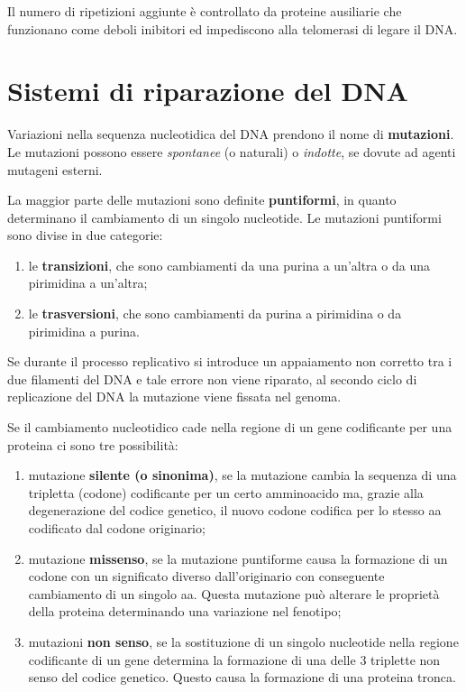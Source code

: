 \documentclass[11pt]{book}
\begin{document}
Il numero di ripetizioni aggiunte è controllato da proteine ausiliarie
che funzionano come deboli inibitori ed impediscono alla telomerasi di
legare il DNA.

\chapter{Sistemi di riparazione del
DNA}\label{sistemi-di-riparazione-del-dna}

Variazioni nella sequenza nucleotidica del DNA prendono il nome di
\textbf{mutazioni}. Le mutazioni possono essere \emph{spontanee} (o
naturali) o \emph{indotte}, se dovute ad agenti mutageni esterni.

La maggior parte delle mutazioni sono definite \textbf{puntiformi}, in
quanto determinano il cambiamento di un singolo nucleotide. Le mutazioni
puntiformi sono divise in due categorie:

\begin{enumerate}
\def\labelenumi{\arabic{enumi}.}
\itemsep1pt\parskip0pt
\item
  le \textbf{transizioni}, che sono cambiamenti da una purina a un'altra
  o da una pirimidina a un'altra;
\item
  le \textbf{trasversioni}, che sono cambiamenti da purina a pirimidina
  o da pirimidina a purina.
\end{enumerate}

Se durante il processo replicativo si introduce un appaiamento non
corretto tra i due filamenti del DNA e tale errore non viene riparato,
al secondo ciclo di replicazione del DNA la mutazione viene fissata nel
genoma.

Se il cambiamento nucleotidico cade nella regione di un gene codificante
per una proteina ci sono tre possibilità:

\begin{enumerate}
\def\labelenumi{\arabic{enumi}.}
\itemsep1pt\parskip0pt
\item
  mutazione \textbf{silente (o sinonima)}, se la mutazione cambia la
  sequenza di una tripletta (codone) codificante per un certo
  amminoacido ma, grazie alla degenerazione del codice genetico, il
  nuovo codone codifica per lo stesso aa codificato dal codone
  originario;
\item
  mutazione \textbf{missenso}, se la mutazione puntiforme causa la
  formazione di un codone con un significato diverso dall'originario con
  conseguente cambiamento di un singolo aa. Questa mutazione può
  alterare le proprietà della proteina determinando una variazione nel
  fenotipo;
\item
  mutazioni \textbf{non senso}, se la sostituzione di un singolo
  nucleotide nella regione codificante di un gene determina la formazione
  di una delle 3 triplette non senso del codice genetico. Questo causa
  la formazione di una proteina tronca.
\end{enumerate}
\end{document}
